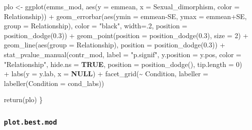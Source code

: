 \documentclass[
  bookmarksnumbered]{article}
\newenvironment{Shaded}{\begin{snugshade}}{\end{snugshade}}
\newcommand{\AttributeTok}[1]{\textcolor[rgb]{0.80,0.80,0.80}{#1}}
\newcommand{\ConstantTok}[1]{\textcolor[rgb]{0.86,0.64,0.64}{\textbf{#1}}}
\newcommand{\DecValTok}[1]{\textcolor[rgb]{0.86,0.86,0.80}{#1}}
\newcommand{\FloatTok}[1]{\textcolor[rgb]{0.75,0.75,0.82}{#1}}
\newcommand{\FunctionTok}[1]{\textcolor[rgb]{0.94,0.94,0.56}{#1}}
\newcommand{\NormalTok}[1]{\textcolor[rgb]{0.80,0.80,0.80}{#1}}
\newcommand{\OtherTok}[1]{\textcolor[rgb]{0.94,0.94,0.56}{#1}}
\newcommand{\SpecialCharTok}[1]{\textcolor[rgb]{0.86,0.64,0.64}{#1}}
\newcommand{\StringTok}[1]{\textcolor[rgb]{0.80,0.58,0.58}{#1}}
\begin{document}
\begin{Shaded}
\begin{Highlighting}[]
\NormalTok{  plo }\OtherTok{\textless{}{-}} \FunctionTok{ggplot}\NormalTok{(emms\_mod, }\FunctionTok{aes}\NormalTok{(}\AttributeTok{y =}\NormalTok{ emmean, }\AttributeTok{x =}\NormalTok{ Sexual\_dimorphism, }\AttributeTok{color =}\NormalTok{ Relationship)) }\SpecialCharTok{+}
  \FunctionTok{geom\_errorbar}\NormalTok{(}\FunctionTok{aes}\NormalTok{(}\AttributeTok{ymin =}\NormalTok{ emmean}\SpecialCharTok{{-}}\NormalTok{SE,}
                    \AttributeTok{ymax =}\NormalTok{ emmean}\SpecialCharTok{+}\NormalTok{SE,}
                    \AttributeTok{group =}\NormalTok{ Relationship), }
                \AttributeTok{color =} \StringTok{"black"}\NormalTok{,}
                \AttributeTok{width=}\NormalTok{.}\DecValTok{2}\NormalTok{,}
                \AttributeTok{position =} \FunctionTok{position\_dodge}\NormalTok{(}\FloatTok{0.3}\NormalTok{)) }\SpecialCharTok{+}
  \FunctionTok{geom\_point}\NormalTok{(}\AttributeTok{position =} \FunctionTok{position\_dodge}\NormalTok{(}\FloatTok{0.3}\NormalTok{), }\AttributeTok{size =} \DecValTok{2}\NormalTok{) }\SpecialCharTok{+}
  \FunctionTok{geom\_line}\NormalTok{(}\FunctionTok{aes}\NormalTok{(}\AttributeTok{group =}\NormalTok{ Relationship),}
            \AttributeTok{position =} \FunctionTok{position\_dodge}\NormalTok{(}\FloatTok{0.3}\NormalTok{)) }\SpecialCharTok{+} 
  \FunctionTok{stat\_pvalue\_manual}\NormalTok{(contr\_mod, }
                     \AttributeTok{label =} \StringTok{"p.signif"}\NormalTok{, }
                     \AttributeTok{y.position =}\NormalTok{ y.pos,}
                     \AttributeTok{color =} \StringTok{"Relationship"}\NormalTok{, }\AttributeTok{hide.ns =} \ConstantTok{TRUE}\NormalTok{,}
                     \AttributeTok{position =} \FunctionTok{position\_dodge}\NormalTok{(),}
                     \AttributeTok{tip.length =} \DecValTok{0}\NormalTok{) }\SpecialCharTok{+}
  \FunctionTok{labs}\NormalTok{(}\AttributeTok{y =}\NormalTok{ y.lab,}
       \AttributeTok{x =} \ConstantTok{NULL}\NormalTok{) }\SpecialCharTok{+}
  \FunctionTok{facet\_grid}\NormalTok{(}\SpecialCharTok{\textasciitilde{}}\NormalTok{ Condition,}
             \AttributeTok{labeller =} \FunctionTok{labeller}\NormalTok{(}\AttributeTok{Condition =}\NormalTok{ cond\_labs)) }
  
    \FunctionTok{return}\NormalTok{(plo)}
\NormalTok{\}}
\end{Highlighting}
\end{Shaded}

\subsubsection{\texorpdfstring{\texttt{plot.best.mod}}{plot.best.mod}}\label{plot.best.mod}
\end{document}
